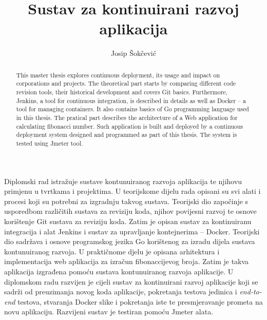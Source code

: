 \documentclass[times, utf8, numeric, diplomski]{ferit}
\begin{document}
\sloppy
\title{Sustav za kontinuirani razvoj aplikacija}

\author{Josip Šokčević}
\maketitle

\tableofcontents














\begin{sazetak}
    Diplomski rad istražuje sustave kontunuiranog razvoja aplikacija te njihovu primjenu u tvrtkama
    i projektima. U teorijskome dijelu rada opisani su svi alati i procesi koji su potrebni za
    izgradnju takvog sustava. Teorijski dio započinje s usporedbom različitih sustava za reviziju
    koda, njihov povijesni razvoj te osnove korištenje Git sustava za reviziju koda. Zatim je opisan
    sustav za kontinuiranu integracija i alat Jenkins i sustav za upravljanje kontejnerima --
    Docker. Teorijski dio sadržava i osnove programskog jezika Go korištenog za izradu dijela
    sustava kontunuiranog razvoja. U praktičnome djelu je opisana arhitektura i implementacija web
    aplikacija za izračun fibonaccijevog broja. Zatim je takva aplikacija izgrađena pomoću sustava
    kontunuiranog razvoja aplikacije. U diplomskom radu razvijen je cijeli sustav za kontinuirani
    razvoj aplikacije koji se sadrži od preuzimanja novog koda aplikacije, pokretanja testova
    jedinica i \textit{end-to-end} testova, stvaranja Docker slike i pokretanja iste te
    presmjeravanje prometa na novu aplikaciju. Razvijeni sustav je testiran pomoću Jmeter alata.

\end{sazetak}

\begin{abstract}
    This master thesis explores continuous deployment, its usage and impact on corporations and
    projects. The theoretical part starts by comparing different code revision tools, their
    historical development and covers Git basics. Furthermore, Jenkins, a tool for continuous
    integration, is described in details as well as Docker -- a tool for managing containers. It
    also contains basics of Go programming language used in this thesis. The pratical part describes
    the architecture of a Web application for calculating fibonacci number. Such application is
    built and deployed by a continuous deployment system designed and programmed as
    part of this thesis. The system is tested using Jmeter tool.

\end{abstract}


\end{document}
